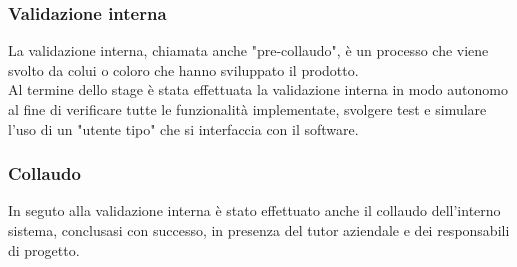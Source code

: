 \subsubsection{Validazione interna}
La validazione interna, chiamata anche "pre-collaudo", è un processo che viene svolto da colui o coloro che hanno sviluppato il prodotto.\\
Al termine dello stage è stata effettuata la validazione interna in modo autonomo al fine di verificare tutte le funzionalità implementate, svolgere test e simulare l'uso di un "utente tipo" che si interfaccia con il software.
\subsubsection{Collaudo}
In seguto alla validazione interna è stato effettuato anche il collaudo dell'interno sistema, conclusasi con successo, in presenza del tutor aziendale e dei responsabili di progetto.

